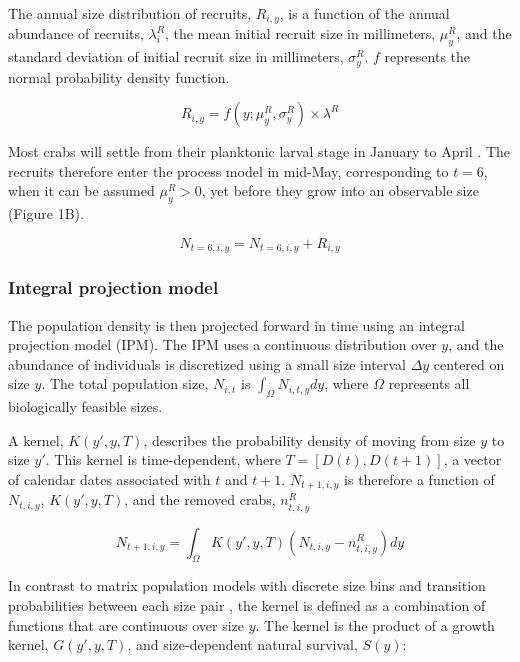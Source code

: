 \documentclass{article}
\begin{document}
The annual size distribution of recruits, $R_{i, y}$, is a function of the annual abundance of recruits, $\lambda^R_i$, the mean initial recruit size in millimeters, $\mu^R_y$, and the standard deviation of initial recruit size in millimeters, $\sigma^R_y$. $f$ represents the normal probability density function.

\begin{equation}
R_{i, y} = f(y; \mu^R_{y}, \sigma^R_{y}) \times \lambda^R
\end{equation}

Most crabs will settle from their planktonic larval stage in January to April \parencite{yamada2005growth}. The recruits therefore enter the process model in mid-May, corresponding to $t=6$, when it can be assumed $\mu^R_y > 0$, yet before they grow into an observable size (Figure 1B).

\begin{equation}
N_{t=6, i, y} =  N_{t=6, i, y} + R_{i, y}
\end{equation}

\subsubsection*{Integral projection model}

The population density is then projected forward in time using an integral projection model (IPM). The IPM uses a continuous distribution over $y$, and the abundance of individuals is discretized using a small size interval $\Delta y$ centered on size $y$. The total population size, $N_{i,t}$ is $\int_{\Omega} N_{i,t,y} dy$, where $\Omega$ represents all biologically feasible sizes.

A kernel, $K(y', y, T)$, describes the probability density of moving from size $y$ to size $y'$. This kernel is time-dependent, where $T = [D(t), D(t+1)]$, a vector of calendar dates associated with $t$ and $t+1$. $N_{t+1,i,y}$ is therefore a function of $N_{t,i,y}$, $K(y', y, T)$, and the removed crabs, $n^R_{t,i,y}$

\begin{equation}
N_{t+1,i,y} = \int_{\Omega} K(y',y, T) (N_{t,i,y} - n^R_{t,i,y}) dy 
\end{equation}

In contrast to matrix population models with discrete size bins and transition probabilities between each size pair \parencite{caswell2001matrix}, the kernel is defined as a combination of functions that are continuous over size $y$. The kernel is the product of a growth kernel, $G(y',y, T)$, and size-dependent natural survival, $S(y)$:
\end{document}

